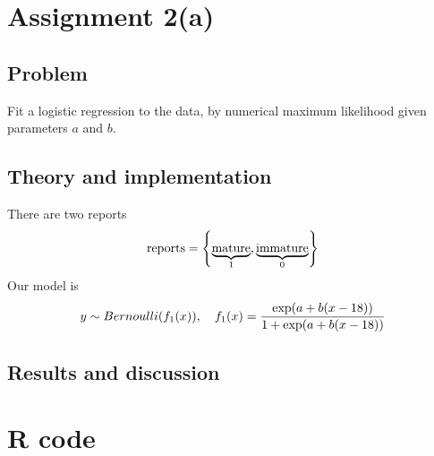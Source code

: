 \documentclass[11pt, a4paper]{article}
\let\originalleft\left
\let\originalright\right
\renewcommand{\left}{\mathopen{}\mathclose\bgroup\originalleft}
\renewcommand{\right}{\aftergroup\egroup\originalright}
\begin{document}
\section{Assignment 2(a)}
\subsection{Problem}
Fit a logistic regression to the data, by numerical maximum likelihood
given parameters $a$ and $b$.
\subsection{Theory and implementation}
There are two reports
$$ \text{reports} = \left\{\underbrace{\text{mature}}_1, \underbrace{\text{immature}}_0\right\} $$
Our model is
$$ y \sim Bernoulli(f_1(x)), \quad f_1(x) = \frac{\exp\left(a + b (x - 18)\right)}{1 + \exp\left(a + b (x - 18)\right)} $$
\subsection{Results and discussion}

\clearpage
\appendix %

\section{R code}
% 
\end{document}

